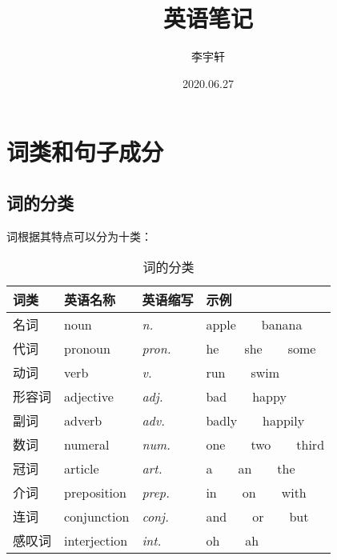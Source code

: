 \documentclass[UTF8]{ctexart}
\title{英语笔记}
\author{李宇轩}
\date{2020.06.27}
\begin{document}
\maketitle

\newpage

\tableofcontents

\newpage

\setlength{\parindent}{0pt}

\section{词类和句子成分}

\subsection{词的分类}
    词根据其特点可以分为十类：\vspace{8pt}
    \begin{table}[h!]
        \begin{center}
            \begin{tabular}{p{60pt}|p{80pt}|p{80pt}|p{100pt}}
                \hline
                词类&英语名称&英语缩写&示例\\ \hline
                名词&noun&\textit{n.}&apple~~~~banana\\ \hline
                代词&pronoun&\textit{pron.}&he~~~~she~~~~some\\ \hline
                动词&verb&\textit{v.}&run~~~~swim\\ \hline
                形容词&adjective&\textit{adj.}&bad~~~~happy\\ \hline
                副词&adverb&\textit{adv.}&badly~~~~happily\\ \hline
                数词&numeral&\textit{num.}&one~~~~two~~~~third\\ \hline
                冠词&article&\textit{art.}&a~~~~an~~~~the\\ \hline
                介词&preposition&\textit{prep.}&in~~~~on~~~~with\\ \hline
                连词&conjunction&\textit{conj.}&and~~~~or~~~~but\\ \hline
                感叹词&interjection&\textit{int.}&oh~~~~ah\\ \hline
            \end{tabular}
            \caption{词的分类}
        \end{center}
    \end{table}\\
\end{document}
